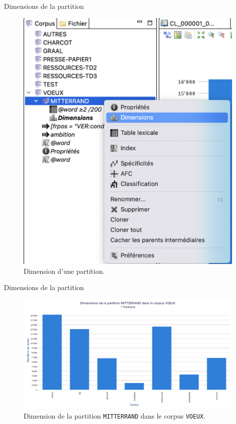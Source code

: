 \documentclass[xetex,xcolor={table,usenames,dvipsnames}]{beamer}
\begin{document}
\begin{frame}{Dimensions de la partition}
	\begin{figure}[h] %
		\centering
		\includegraphics[width=.5\linewidth]{img/dimensions.png}
		\caption{Dimension d'une partition.}
		\label{fig:ling_out_TAL}
	\end{figure}
\end{frame}

\begin{frame}{Dimensions de la partition}
			\begin{figure}[h] %
		\centering
		\includegraphics[width=1\linewidth]{img/dimensions_mitterrand.png}
		\caption{Dimension de la partition \texttt{MITTERRAND} dans le corpus \texttt{VOEUX}.}
		\label{fig:ling_out_TAL}
	\end{figure}
\end{frame}
\end{document}
